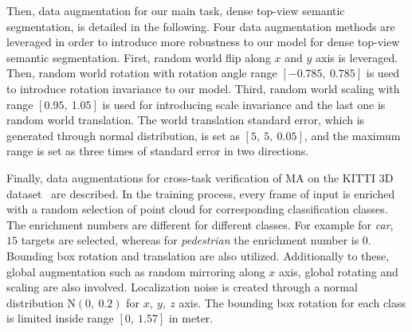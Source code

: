 \documentclass[lettersize,journal]{IEEEtran}
\begin{document}
Then, data augmentation for our main task, dense top-view semantic segmentation, is detailed in the following. Four data augmentation methods are leveraged in order to introduce more robustness to our model for dense top-view semantic segmentation.
First, random world flip along $x$ and $y$ axis is leveraged.
Then, random world rotation with rotation angle range $[-0.785,~0.785]$ is used to introduce rotation invariance to our model.
Third, random world scaling with range $[0.95,~1.05]$ is used for introducing scale invariance and the last one is random world translation.
The world translation standard error, which is generated through normal distribution, is set as $[5,~5,~0.05]$, and the maximum range is set as three times of standard error in two directions.

Finally, data augmentations for cross-task verification of MA on the KITTI 3D dataset~\cite{kitti} are described.
In the training process, every frame of input is enriched with a random selection of point cloud for corresponding classification classes. The enrichment numbers are different for different classes.
For example for \emph{car}, $15$ targets are selected, whereas for \emph{pedestrian} the enrichment number is $0$.
Bounding box rotation and translation are also utilized. Additionally to these, global augmentation such as random mirroring along $x$ axis, global rotating and scaling are also involved. Localization noise is created through a normal distribution $\mathrm{N}(0,~0.2)$ for $x,~y,~z$ axis. The bounding box rotation for each class is limited inside range $[0,~1.57]$ in meter.


\end{document}
